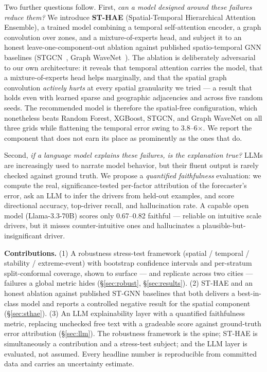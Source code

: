 \documentclass[sigconf, review, nonacm]{acmart}
\begin{document}
Two further questions follow. First, \emph{can a model designed around these failures reduce them?} We
introduce \textbf{ST-HAE} (Spatial-Temporal Hierarchical Attention Ensemble), a trained model combining
a temporal self-attention encoder, a graph convolution over zones, and a mixture-of-experts head, and
subject it to an honest leave-one-component-out ablation against published spatio-temporal GNN baselines
(STGCN~\cite{yu2018stgcn}, Graph WaveNet~\cite{wu2019graphwavenet}). The ablation is deliberately
adversarial to our own architecture: it reveals that temporal attention carries the model, that a
mixture-of-experts head helps marginally, and that the spatial graph convolution \emph{actively hurts}
at every spatial granularity we tried --- a result that holds even with learned sparse and geographic
adjacencies and across five random seeds. The recommended model is therefore the spatial-free
configuration, which nonetheless beats Random Forest, XGBoost, STGCN, and Graph WaveNet on all three
grids while flattening the temporal error swing to 3.8--6$\times$. We report the component that does not
earn its place as prominently as the ones that do.

Second, \emph{if a language model explains these failures, is the explanation true?} LLMs are
increasingly used to narrate model behavior, but their fluent output is rarely checked against ground
truth. We propose a \emph{quantified faithfulness} evaluation: we compute the real,
significance-tested per-factor attribution of the forecaster's error, ask an LLM to infer the drivers
from held-out examples, and score directional accuracy, top-driver recall, and hallucination rate. A
capable open model (Llama-3.3-70B) scores only 0.67--0.82 faithful --- reliable on intuitive scale
drivers, but it misses counter-intuitive ones and hallucinates a plausible-but-insignificant driver.

\noindent\textbf{Contributions.}
(1) A robustness stress-test framework (spatial / temporal / stability / extreme-event) with bootstrap
confidence intervals and per-stratum split-conformal coverage, shown to surface --- and replicate
across two cities --- failures a global metric hides (\S\ref{sec:robust}, \S\ref{sec:results}).
(2) ST-HAE and an honest ablation against published ST-GNN baselines that both delivers a best-in-class
model and reports a controlled negative result for the spatial component (\S\ref{sec:sthae}).
(3) An LLM explainability layer with a quantified faithfulness metric, replacing unchecked free text
with a gradeable score against ground-truth error attribution (\S\ref{sec:llm}).
The robustness framework is the spine; ST-HAE is simultaneously a contribution and a stress-test
subject; and the LLM layer is evaluated, not assumed. Every headline number is reproducible from
committed data and carries an uncertainty estimate.
\end{document}
